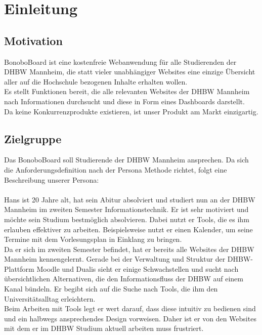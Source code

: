 \documentclass[a4paper,11pt]{scrartcl}
\begin{document}


\section{Einleitung}
	\subsection{Motivation} %
BonoboBoard ist eine kostenfreie Webanwendung für alle Studierenden der DHBW Mannheim, die statt vieler unabhängiger Websites eine einzige Übersicht aller auf die Hochschule bezogenen Inhalte erhalten wollen.\\
Es stellt Funktionen bereit, die alle relevanten Websites der DHBW Mannheim nach Informationen durchsucht und diese in Form eines Dashboards darstellt.\\
Da keine Konkurrenzprodukte existieren, ist unser Produkt am Markt einzigartig.


	\subsection{Zielgruppe} %
Das BonoboBoard soll Studierende der DHBW Mannheim ansprechen. Da sich die Anforderungsdefinition nach der Persona Methode richtet, folgt eine Beschreibung unserer Persona:\\\\
Hans ist 20 Jahre alt, hat sein Abitur absolviert und studiert nun an der DHBW Mannheim im zweiten Semester Informationstechnik. Er ist sehr motiviert und möchte sein Studium bestmöglich absolvieren. Dabei nutzt er Tools, die es ihm erlauben effektiver zu arbeiten. Beispielsweise nutzt er einen Kalender, um seine Termine mit dem Vorlesungsplan in Einklang zu bringen.\\ 
Da er sich im zweiten Semester befindet, hat er bereits alle Websites der DHBW Mannheim kennengelernt. Gerade bei der Verwaltung und Struktur der DHBW-Plattform Moodle und Dualis sieht er einige Schwachstellen und sucht nach übersichtlichen Alternativen, die den Informationsfluss der DHBW auf einem Kanal bündeln. Er begibt sich auf die Suche nach Tools, die ihm den Universitätsalltag erleichtern.\\
Beim Arbeiten mit Tools legt er wert darauf, dass diese intuitiv zu bedienen sind und ein halbwegs ansprechendes Design vorweisen. Daher ist er von den Websites mit dem er im DHBW Studium aktuell arbeiten muss frustriert.
\end{document}
